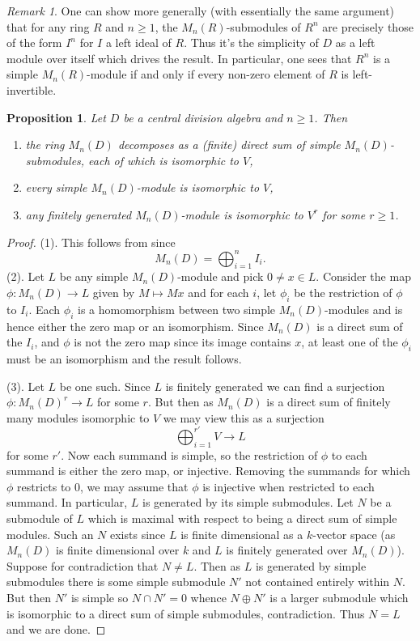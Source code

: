 \documentclass[11pt]{amsart}
\numberwithin{equation}{section}
\newtheorem{proposition}[equation]{Proposition}
\theoremstyle{remark}
\newtheorem{remark}[equation]{Remark}
\theoremstyle{remark}
\theoremstyle{remark}
\theoremstyle{definition}
\theoremstyle{definition}
\theoremstyle{definition}
\theoremstyle{definition}
\theoremstyle{definition}
\theoremstyle{definition}
\begin{document}
\begin{remark}
One can show more generally (with essentially the same argument) that for any ring $R$ and $n\geq 1$, the $M_n(R)$-submodules of $R^n$ are precisely those of the form $I^n$ for $I$ a left ideal of $R$. Thus it's the simplicity of $D$ as a left module over itself which drives the result. In particular, one sees that $R^n$ is a simple $M_n(R)$-module if and only if every non-zero element of $R$ is left-invertible.
\end{remark}

\begin{proposition}
Let $D$ be a central division algebra and $n\geq 1$. Then 
\begin{enumerate}
\item the ring $M_n(D)$ decomposes as a (finite) direct sum of simple $M_n(D)$-submodules, each of which is isomorphic to $V$,
\item every simple $M_n(D)$-module is isomorphic to $V$,
\item any  finitely generated  $M_n(D)$-module is  isomorphic to $V^r$ for some $r\geq 1$. 
\end{enumerate}
\end{proposition}

\begin{proof}
(1). This follows from  since 
\[M_n(D)=\bigoplus_{i=1}^n I_i.\]
(2). Let $L$ be any simple $M_n(D)$-module and pick $0\neq x\in L$. Consider the map $\phi:M_n(D)\rightarrow L$ given by $M\mapsto Mx$ and for each $i$, let $\phi_i$ be the restriction of $\phi$ to $I_i$. Each $\phi_i$ is a homomorphism between two simple $M_n(D)$-modules and is hence either the zero map or an isomorphism. Since $M_n(D)$ is a direct sum of the $I_i$, and $\phi$ is not the zero map since its image contains $x$, at least one of the $\phi_i$ must be an isomorphism and the result follows. 

(3).  Let $L$ be one such. Since $L$ is finitely generated we can find a surjection $\phi:M_n(D)^r\rightarrow L$ for some $r$. But then as $M_n(D)$ is a direct sum of finitely many modules isomorphic to $V$ we may view this as a surjection \[\bigoplus_{i=1}^{r'}V\rightarrow L\]
for some $r'$. Now each summand is simple, so the restriction of $\phi$ to each summand is either the zero map, or injective. Removing the summands for which $\phi$ restricts to $0$, we may assume that $\phi$ is injective when restricted to each summand. In particular, $L$ is generated by its simple submodules. Let $N$ be a submodule of $L$ which is maximal with respect to being a direct sum of simple modules. Such an $N$ exists since $L$ is finite dimensional as a $k$-vector space (as $M_n(D)$ is finite dimensional over $k$ and $L$ is finitely generated over $M_n(D)$). Suppose for contradiction that $N\neq L$. Then as $L$ is generated by simple submodules there is some simple submodule $N'$ not contained entirely within $N$. But then $N'$ is simple so $N\cap N'=0$ whence $N\oplus N'$ is a larger submodule which is isomorphic to a direct sum of simple submodules, contradiction. Thus $N=L$ and we are done. 
\end{proof}
\end{document}
